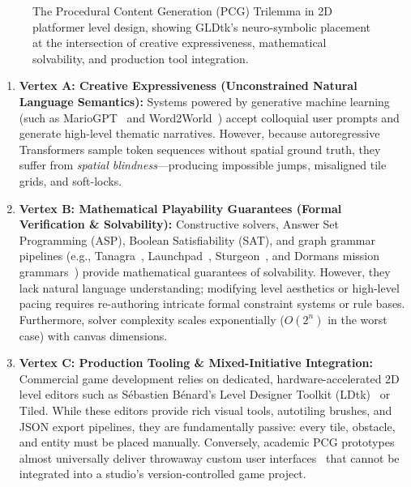 \documentclass[11pt,a4paper]{report}
\theoremstyle{definition}
\theoremstyle{remark}
\begin{document}
\begin{figure}[htbp]
\caption{The Procedural Content Generation (PCG) Trilemma in 2D platformer level design, showing GLDtk's neuro-symbolic placement at the intersection of creative expressiveness, mathematical solvability, and production tool integration.}
\label{fig:trilemma}
\end{figure}

\begin{enumerate}
    \item \textbf{Vertex A: Creative Expressiveness (Unconstrained Natural Language Semantics):}
    Systems powered by generative machine learning (such as MarioGPT~\citep{sudhakaran2023mariogpt} and Word2World~\citep{nasir2024word2world}) accept colloquial user prompts and generate high-level thematic narratives. However, because autoregressive Transformers sample token sequences without spatial ground truth, they suffer from \emph{spatial blindness}---producing impossible jumps, misaligned tile grids, and soft-locks.
    
    \item \textbf{Vertex B: Mathematical Playability Guarantees (Formal Verification \& Solvability):}
    Constructive solvers, Answer Set Programming (ASP), Boolean Satisfiability (SAT), and graph grammar pipelines (e.g., Tanagra~\citep{smith2011tanagra}, Launchpad~\citep{smith2011launchpad}, Sturgeon~\citep{cooper2022sturgeon}, and Dormans mission grammars~\citep{dormans2010adventures, dormans2011generating}) provide mathematical guarantees of solvability. However, they lack natural language understanding; modifying level aesthetics or high-level pacing requires re-authoring intricate formal constraint systems or rule bases. Furthermore, solver complexity scales exponentially ($O(2^n)$ in the worst case) with canvas dimensions.
    
    \item \textbf{Vertex C: Production Tooling \& Mixed-Initiative Integration:}
    Commercial game development relies on dedicated, hardware-accelerated 2D level editors such as Sébastien Bénard's Level Designer Toolkit (LDtk)~\citep{benard2020ldtk} or Tiled. While these editors provide rich visual tools, autotiling brushes, and JSON export pipelines, they are fundamentally passive: every tile, obstacle, and entity must be placed manually. Conversely, academic PCG prototypes almost universally deliver throwaway custom user interfaces~\citep{liapis2013sentient, guzdial2019morai} that cannot be integrated into a studio's version-controlled game project.
\end{enumerate}
\end{document}
